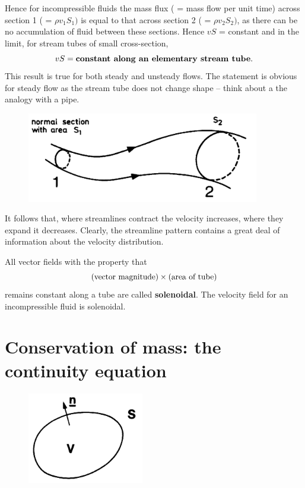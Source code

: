 \documentclass[twoside,a4paper,11pt]{report}
\begin{document}
Hence for incompressible fluids the mass flux ( = mass flow per unit time) 
across section 1 ( = $\rho v_{1}S_{1})$ is equal to that across section 
2 ( = $\rho v_{2}S_{2})$, as there can be no accumulation of fluid 
between these sections. Hence $vS$ = constant and in the limit, for stream 
tubes of small cross-section,
\[
vS = \hbox{\textbf{constant along an elementary stream tube}.}
\]
This result is true for both steady and unsteady flows. The statement is 
obvious for steady flow as the stream tube does not change shape -- think 
about a the analogy with a pipe.

\begin{figure}[htbp]
\centerline{\includegraphics[width=4in]{Section6.pdf}}
\label{fig6}
\end{figure}

It follows that, where streamlines contract the velocity increases, where 
they expand it decreases. Clearly, the streamline pattern contains a great 
deal of information about the velocity distribution.

All vector fields with the property that
\[
\hbox{(vector magnitude)} \times \hbox{(area of tube)}
\]
remains constant along a tube are called \textbf{solenoidal}. The velocity 
field for an incompressible fluid is solenoidal.

\section{Conservation of mass: the continuity equation}

\begin{figure}
\centerline{\includegraphics[width=2in]{Section7.pdf}}
\label{fig7}
\end{figure}
\end{document}
